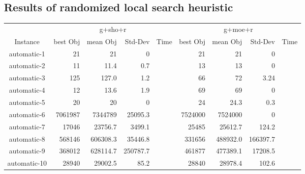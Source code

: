 \documentclass[11pt]{article}
\begin{document}
\subsection{Results of randomized local search heuristic}
{

\center
\begin{tabular}{c|rrrr|rrrr}
	     & \multicolumn{4}{c}{g+sho+r}               & \multicolumn{4}{c}{g+moe+r}  \\
Instance     & best Obj & mean Obj & Std-Dev & Time      &  best Obj & mean Obj & Std-Dev & Time          \\
\hline
automatic-1  & 21       & 21       & 0       &           &  21       &  21      & 0       &                 \\
automatic-2  & 11       & 11.4     & 0.7     &           &  13       &  13      & 0       &               \\
automatic-3  & 125      & 127.0    & 1.2     &           &  66       &  72      & 3.24    &              \\
automatic-4  & 12       & 13.6     & 1.9     &           &  69       &  69      & 0       &                \\
automatic-5  & 20       & 20       & 0       &           &  24       &  24.3    & 0.3     &               \\
automatic-6  & 7061987  & 7344789  & 25095.3 &           &  7524000  &  7524000 & 0       &                 \\
automatic-7  & 17046    & 23756.7  & 3499.1  &           &  25485    &  25612.7 & 124.2   &            \\
automatic-8  & 568146   & 606308.3 & 35446.8 &           &  331656   &  488932.0& 166397.7&           \\
automatic-9  & 368012   & 628114.7 & 250787.7&           &  461877   &  477389.1& 17208.5 &                 \\
automatic-10 & 28940    & 29002.5  & 85.2    &           &  28840    &  28978.4 & 102.6   &                 \\
\end{tabular}

}
\end{document}
